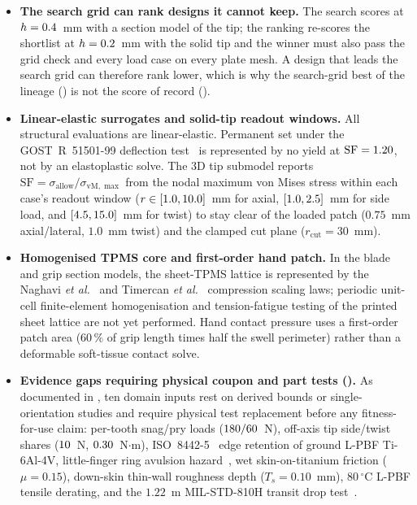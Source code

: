 \begin{itemize}
exactly.
\item \textbf{The search grid can rank designs it cannot keep.} The search scores at $h = 0.4$~mm with a section model of the tip;
the ranking re-scores the shortlist at $h = 0.2$~mm with the solid tip and the winner must also pass the grid check and every
load case on every plate mesh. A design that leads the search grid can therefore rank lower, which is why the search-grid best of the
lineage (\gPoolFinalBest) is not the score of record (\gScore).
\item \textbf{Linear-elastic surrogates and solid-tip readout windows.} All structural evaluations are linear-elastic. Permanent set
under the GOST~R~51501-99 deflection test~\cite{gost51501} is represented by no yield at $\mathrm{SF} = 1.20$, not by an
elastoplastic solve. The 3D  tip submodel reports $\mathrm{SF} = \sigma_\mathrm{allow} / \sigma_{\mathrm{vM},\max}$
from the nodal maximum von Mises stress within each case's readout window ($r \in [1.0, 10.0]$~mm for axial,
$[1.0, 2.5]$~mm for side load, and $[4.5, 15.0]$~mm for twist) to stay clear of the loaded
patch ($0.75$~mm axial/lateral, $1.0$~mm twist) and the clamped cut plane ($r_\mathrm{cut} = 30$~mm).
\item \textbf{Homogenised TPMS core and first-order hand patch.} In the blade and grip section models, the sheet-TPMS lattice
is represented by the Naghavi \emph{et al.}~\cite{naghavi2022} and Timercan \emph{et al.}~\cite{timercan2021} compression
scaling laws; periodic unit-cell finite-element homogenisation and tension-fatigue testing of the printed sheet lattice are not
yet performed. Hand contact pressure uses a first-order patch area ($60\,\%$ of grip length times half the swell perimeter)
rather than a deformable soft-tissue contact solve.
\item \textbf{Evidence gaps requiring physical coupon and part tests ().} As documented in
, ten domain inputs rest on derived bounds or single-orientation
studies and require physical test replacement before any fitness-for-use claim: per-tooth snag/pry loads ($180/60$~N),
off-axis tip side/twist shares ($10$~N, $0.30$~N$\cdot$m), ISO~8442-5~\cite{iso8442-5} edge retention of ground L-PBF
Ti-6Al-4V, little-finger ring avulsion hazard~\cite{hidh}, wet skin-on-titanium friction ($\mu = 0.15$), down-skin thin-wall
roughness depth ($T_s = 0.10$~mm), $80\,^\circ\mathrm{C}$ L-PBF tensile derating, and the $1.22$~m MIL-STD-810H transit drop
test~\cite{mil810h,fl1}.
\end{itemize}
